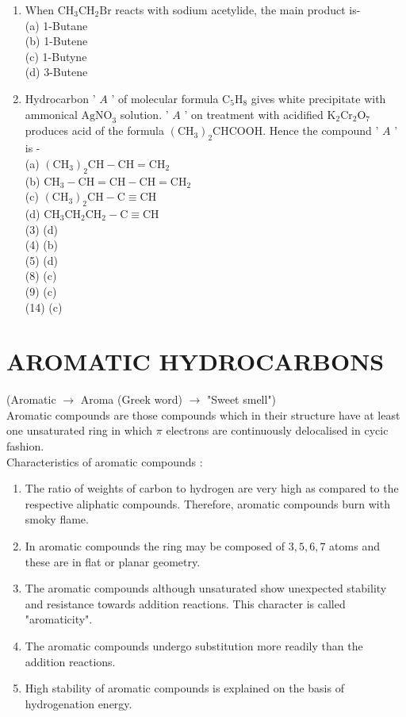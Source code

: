 \documentclass[10pt]{article}
\begin{document}
\begin{enumerate}
  \item When $\mathrm{CH}_{3} \mathrm{CH}_{2} \mathrm{Br}$ reacts with sodium acetylide, the main product is-\\
(a) 1-Butane\\
(b) 1-Butene\\
(c) 1-Butyne\\
(d) 3-Butene
  \item Hydrocarbon ' $A$ ' of molecular formula $\mathrm{C}_{5} \mathrm{H}_{8}$ gives white precipitate with ammonical $\mathrm{AgNO}_{3}$ solution. ' $A$ ' on treatment with acidified $\mathrm{K}_{2} \mathrm{Cr}_{2} \mathrm{O}_{7}$ produces acid of the formula $\left(\mathrm{CH}_{3}\right)_{2} \mathrm{CHCOOH}$. Hence the compound ' $A$ ' is -\\
(a) $\left(\mathrm{CH}_{3}\right)_{2} \mathrm{CH}-\mathrm{CH}=\mathrm{CH}_{2}$\\
(b) $\mathrm{CH}_{3}-\mathrm{CH}=\mathrm{CH}-\mathrm{CH}=\mathrm{CH}_{2}$\\
(c) $\left(\mathrm{CH}_{3}\right)_{2} \mathrm{CH}-\mathrm{C} \equiv \mathrm{CH}$\\
(d) $\mathrm{CH}_{3} \mathrm{CH}_{2} \mathrm{CH}_{2}-\mathrm{C} \equiv \mathrm{CH}$\\
(3) (d)\\
(4) (b)\\
(5) (d)\\
(8) (c)\\
(9) (c)\\
(14) (c)
\end{enumerate}

\section*{AROMATIC HYDROCARBONS}
(Aromatic $\longrightarrow$ Aroma (Greek word) $\longrightarrow$ "Sweet smell")\\
Aromatic compounds are those compounds which in their structure have at least one unsaturated ring in which $\pi$ electrons are continuously delocalised in cycic fashion.\\
Characteristics of aromatic compounds :

\begin{enumerate}
  \item The ratio of weights of carbon to hydrogen are very high as compared to the respective aliphatic compounds. Therefore, aromatic compounds burn with smoky flame.
  \item In aromatic compounds the ring may be composed of $3,5,6,7$ atoms and these are in flat or planar geometry.
  \item The aromatic compounds although unsaturated show unexpected stability and resistance towards addition reactions. This character is called "aromaticity".
  \item The aromatic compounds undergo substitution more readily than the addition reactions.
  \item High stability of aromatic compounds is explained on the basis of hydrogenation energy.
\end{enumerate}
\end{document}
